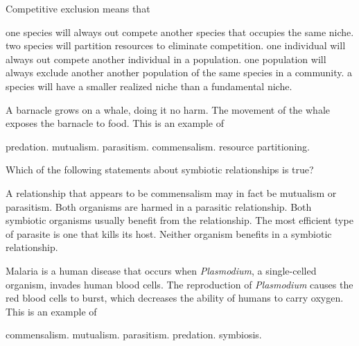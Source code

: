 \question
Competitive exclusion means that

\begin{choices}
	\correctchoice one species will always out compete another species that occupies the same niche.  %
	\choice two species will partition resources to eliminate competition. %
	\choice one individual will always out compete another individual in a population. %
	\choice one population will always exclude another another population of the same species in a community. %
	\choice a species will have a smaller realized niche than a fundamental niche. %
\end{choices}



\question
A barnacle grows on a whale, doing it no harm. The movement of the whale exposes the barnacle to food. This is an example of

\begin{choices}
	\choice predation.%
	\choice mutualism.%
	\choice parasitism.%
	\correctchoice commensalism.%
	\choice resource partitioning.%
\end{choices}

\question
Which of the following statements about symbiotic relationships is true?

\begin{choices}
	\correctchoice A relationship that appears to be commensalism may in fact be mutualism or parasitism.%
	\choice Both organisms are harmed in a parasitic relationship.%
	\choice Both symbiotic organisms usually benefit from the relationship.%
	\choice The most efficient type of parasite is one that kills its host.%
	\choice Neither organism benefits in a symbiotic relationship.%
\end{choices}

\question
Malaria is a human disease that occurs when \textit{Plasmodium}, a single-celled organism, invades human blood cells.  The reproduction of \textit{Plasmodium} causes the red blood cells to burst, which decreases the ability of humans to carry oxygen. This is an example of 

\begin{choices}
	\choice commensalism.%
	\choice mutualism.%
	\correctchoice parasitism.%
	\choice predation.%
	\choice symbiosis.%
\end{choices}


